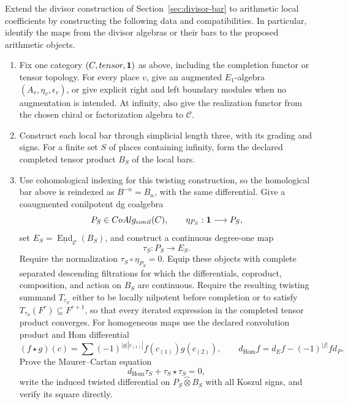 \begin{openproblem}
\label{problem:bar}
Extend the divisor construction of Section~\ref{sec:divisor-bar} to
arithmetic local coefficients by constructing the following data and
compatibilities.  In particular, identify the maps from the divisor
algebras or their bars to the proposed arithmetic objects.

\begin{enumerate}
\item Fix one category
\((C,tensor,\mathbf 1)\) as above, including the completion
functor or tensor topology.  For every place \(v\), give an augmented
\(E_1\)-algebra \((A_v,\eta_v,\epsilon_v)\), or give explicit right and
left boundary modules when no augmentation is intended.  At infinity,
also give the realization functor from the chosen chiral or factorization
algebra to \(\mathcal C\).

\item Construct each local bar through simplicial length three, with its
grading and signs.  For a finite set \(S\) of places containing infinity,
form the declared completed tensor product \(B_S\) of the local bars.

\item Use cohomological indexing for this twisting construction, so the
homological bar above is reindexed as \(B^{-n}=B_n\), with the same
differential.  Give a coaugmented conilpotent dg coalgebra
\[
 P_S\in CoAlg_{conil}(C),
 \qquad \eta_{P_S}:\mathbf 1\longrightarrow P_S,
\]
set
\(E_S=\underline{\operatorname{End}}_{\mathcal C}(B_S)\), and construct a
continuous degree-one map
\[
 \tau_S:P_S\longrightarrow E_S.
\]
Require the normalization \(\tau_S\circ\eta_{P_S}=0\).  Equip these
objects with complete separated descending filtrations for which the
differentials, coproduct, composition, and action on \(B_S\) are continuous.
Require the resulting twisting summand \(T_{\tau_S}\) either to be locally
nilpotent before completion or to satisfy
\(T_{\tau_S}(F^r)\subseteq F^{r+1}\), so that every iterated expression in
the completed tensor product converges.
For homogeneous maps use the declared convolution product and Hom
differential
\[
 (f\star g)(c)=
 \sum(-1)^{|g||c_{(1)}|}f(c_{(1)})g(c_{(2)}),
 \qquad
 d_{\mathrm{Hom}}f=d_Ef-(-1)^{|f|}f d_P.
\]
Prove the Maurer--Cartan equation
\[
 d_{\mathrm{Hom}}\tau_S+\tau_S\star\tau_S=0,
\]
write the induced twisted differential on
\(P_S\widehat\otimes B_S\) with all Koszul signs, and verify its square
directly.


\end{enumerate}
\end{openproblem}
